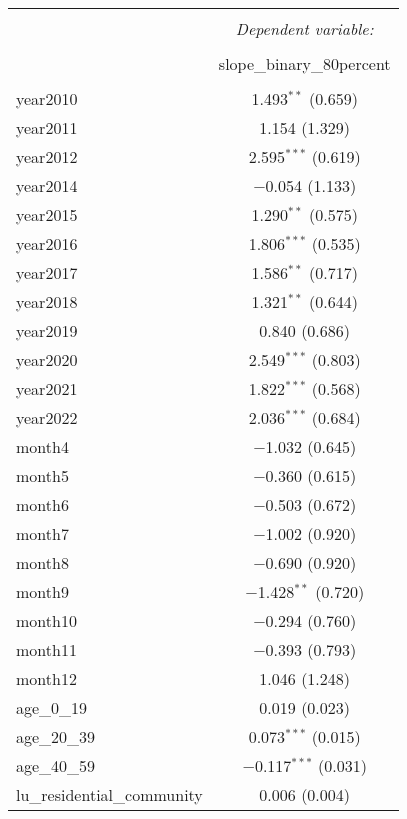 \begin{table}[!htbp] \centering 
  \caption{} 
  \label{} 
\small 
\begin{tabular}{@{\extracolsep{1pt}}lc} 
\\[-1.8ex]\hline 
\hline \\[-1.8ex] 
 & \multicolumn{1}{c}{\textit{Dependent variable:}} \\ 
\cline{2-2} 
\\[-1.8ex] & slope\_binary\_80percent \\ 
\hline \\[-1.8ex] 
 year2010 & 1.493$^{**}$ (0.659) \\ 
  year2011 & 1.154 (1.329) \\ 
  year2012 & 2.595$^{***}$ (0.619) \\ 
  year2014 & $-$0.054 (1.133) \\ 
  year2015 & 1.290$^{**}$ (0.575) \\ 
  year2016 & 1.806$^{***}$ (0.535) \\ 
  year2017 & 1.586$^{**}$ (0.717) \\ 
  year2018 & 1.321$^{**}$ (0.644) \\ 
  year2019 & 0.840 (0.686) \\ 
  year2020 & 2.549$^{***}$ (0.803) \\ 
  year2021 & 1.822$^{***}$ (0.568) \\ 
  year2022 & 2.036$^{***}$ (0.684) \\ 
  month4 & $-$1.032 (0.645) \\ 
  month5 & $-$0.360 (0.615) \\ 
  month6 & $-$0.503 (0.672) \\ 
  month7 & $-$1.002 (0.920) \\ 
  month8 & $-$0.690 (0.920) \\ 
  month9 & $-$1.428$^{**}$ (0.720) \\ 
  month10 & $-$0.294 (0.760) \\ 
  month11 & $-$0.393 (0.793) \\ 
  month12 & 1.046 (1.248) \\ 
  age\_0\_19 & 0.019 (0.023) \\ 
  age\_20\_39 & 0.073$^{***}$ (0.015) \\ 
  age\_40\_59 & $-$0.117$^{***}$ (0.031) \\ 
  lu\_residential\_community & 0.006 (0.004) \\ 

\end{tabular}
\end{table}
